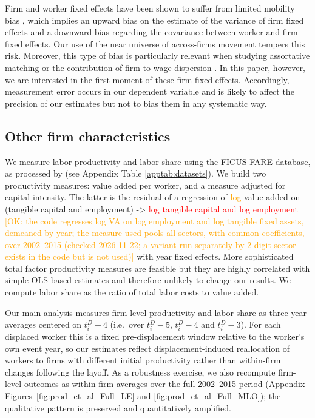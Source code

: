 Firm and worker fixed effects have been shown to suffer from limited mobility bias \citep{andrews2008high}, which implies an upward bias on the estimate of the variance of firm fixed effects and a downward bias regarding the covariance between worker and firm fixed effects. Our use of the near universe of across-firms movement tempers this risk. Moreover, this type of bias is particularly relevant when studying assortative matching \citep{bonhomme2019distributional} or the contribution of firm to wage dispersion \citep{song2019firming}. %
In this paper, however, we are interested in the first moment of these firm fixed effects. Accordingly, measurement error occurs in our dependent variable and is likely to affect the precision of our estimates but not to bias them in any systematic way.


\subsection{Other firm characteristics}
\label{sec:data:firm:other}

We measure labor productivity and labor share using the FICUS-FARE database, as processed by \citet{burstein_etal_2025} (see Appendix Table \ref{apptab:datasets}). We build two productivity measures: value added per worker, and a measure adjusted for capital intensity. The latter is the residual of a regression of \textcolor{orange}{log} value added on (tangible capital and employment) -> \textcolor{red}{log tangible capital and log employment} \textcolor{orange}{[OK: the code regresses log VA on log employment and log tangible fixed assets, demeaned by year; the measure used pools all sectors, with common coefficients, over 2002--2015 (checked 2026-11-22; a variant run separately by 2-digit sector exists in the code but is not used)]} with year fixed effects. More sophisticated total factor productivity measures are feasible but they are highly correlated with simple OLS-based estimates \citep{van2012total} and therefore unlikely to change our results. We compute labor share as the ratio of total labor costs to value added.

Our main analysis measures firm-level productivity and labor share as three-year averages centered on $t^D_i-4$ (i.e.\ over $t^D_i-5$, $t^D_i-4$ and $t^D_i-3$). For each displaced worker this is a fixed pre-displacement window relative to the worker's own event year, so our estimates reflect displacement-induced reallocation of workers to firms with different initial productivity rather than within-firm changes following the layoff. As a robustness exercise, we also recompute firm-level outcomes as within-firm averages over the full 2002--2015 period (Appendix Figures~\ref{fig:prod_et_al_Full_LE} and \ref{fig:prod_et_al_Full_MLO}); the qualitative pattern is preserved and quantitatively amplified.


